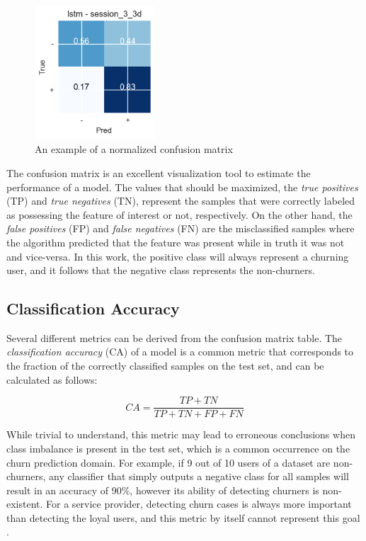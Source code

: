 \documentclass{kththesis}
\begin{document}
\begin{figure}[h]
    \centering
    \includegraphics[width=0.4\textwidth, natwidth=50bp, natheight=50bp]{figures/confusion_example.png}
    \caption{An example of a normalized confusion matrix}
    \label{fig:confusion_example}
\end{figure}

The confusion matrix is an excellent visualization tool to estimate the performance of a model. The values that should be maximized, the \emph{true positives} (TP) and \emph{true negatives} (TN), represent the samples that were correctly labeled as possessing the feature of interest or not, respectively. On the other hand, the \emph{false positives} (FP) and \emph{false negatives} (FN) are the misclassified samples where the algorithm predicted that the feature was present while in truth it was not and vice-versa. In this work, the positive class will always represent a churning user, and it follows that the negative class represents the non-churners.

\subsection{Classification Accuracy}

Several different metrics can be derived from the confusion matrix table. The \emph{classification accuracy} (CA) of a model is a common metric that corresponds to the fraction of the correctly classified samples on the test set, and can be calculated as follows:

\begin{equation}
CA = \frac{TP + TN}{TP + TN + FP + FN} 
\end{equation}

While trivial to understand, this metric may lead to erroneous conclusions when class imbalance is present in the test set, which is a common occurrence on the churn prediction domain. For example, if 9 out of 10 users of a dataset are non-churners, any classifier that simply outputs a negative class for all samples will result in an accuracy of 90\%, however its ability of detecting churners is non-existent. For a service provider, detecting churn cases is always more important than detecting the loyal users, and this metric by itself cannot represent this goal \citep{Burez2009} \citep{Hassouna2015}.
\end{document}

